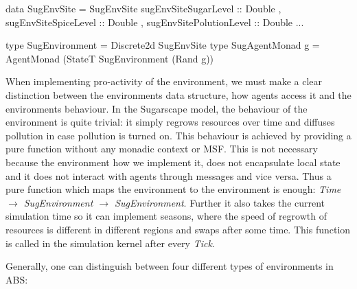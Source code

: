 \begin{HaskellCode}
data SugEnvSite = SugEnvSite 
  { sugEnvSiteSugarLevel    :: Double
  , sugEnvSiteSpiceLevel    :: Double
  , sugEnvSitePolutionLevel :: Double
  ...
  }

type SugEnvironment  = Discrete2d SugEnvSite
type SugAgentMonad g = AgentMonad (StateT SugEnvironment (Rand g))
\end{HaskellCode}

When implementing pro-activity of the environment, we must make a clear distinction between the environments data structure, how agents access it and the environments behaviour. In the Sugarscape model, the behaviour of the environment is quite trivial: it simply regrows resources over time and diffuses pollution in case pollution is turned on. This behaviour is achieved by providing a pure function without any monadic context or MSF. This is not necessary because the environment how we implement it, does not encapsulate local state and it does not interact with agents through messages and vice versa. Thus a pure function which maps the environment to the environment is enough: \textit{Time $\rightarrow$ SugEnvironment $\rightarrow$ SugEnvironment}. Further it also takes the current simulation time so it can implement seasons, where the speed of regrowth of resources is different in different regions and swaps after some time. This function is called in the simulation kernel after every \textit{Tick}.

\medskip

Generally, one can distinguish between four different types of environments in ABS:

